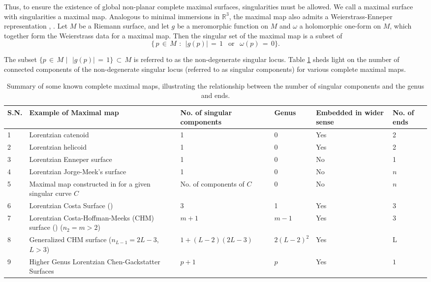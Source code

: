 \documentclass[12pt]{amsart}
\numberwithin{equation}{section}
\begin{document}
Thus, to ensure the existence of global non-planar complete maximal surfaces, singularities must be allowed. 
We call a maximal surface with singularities a maximal map. Analogous to minimal immersions in 
\(\mathbb{R}^3\), the maximal map also admits a Weierstrass-Enneper representation \cite{Estudillo1992}, 
\cite{KOBAYASHI1983}. Let \(M\) be a Riemann surface, and let \(g\) be a meromorphic function on
$M$ and \(\omega\) a 
holomorphic one-form on $M$, which together form the Weierstrass data for a maximal map. Then the
singular set of the maximal map is a subset of
 \[
 \{\,p \,\in\, M\ \, :\ \  |g(p)| \,=\, 1\, \;\text{ or }\, \; \omega(p) \,=\, 0\}.
\]

The subset \(\{p \,\in\, M\,\,\big\vert\,\,\,\, |g(p)| \,=\, 1\}\, \subset\, M\) is referred to as the
non-degenerate singular locus. Table \ref{Table of singular components} sheds light on the number of
connected components of the non-degenerate singular locus (referred to as singular components) for various
complete maximal maps.

\begin{table}[ht]
 \centering
\begin{tabular}{|m{1cm}|m{4cm}|m{3cm}|m{2cm}|m{2cm}|m{1cm}|}
\hline
       S.N. &Example of Maximal map & No. of singular components & Genus & Embedded in wider sense & No. of ends\\ \hline
       1 & Lorentzian catenoid & 1 & 0 & Yes & 2\\ \hline 
        2 &Lorentzian helicoid & 1 & 0 & Yes & 2 \\ \hline
         3& Lorentzian Enneper surface & 1 & 0 & No & 1 \\ \hline
        4& Lorentzian Jorge-Meek's surface & 1 & 0 & No & $n$\\ \hline
         5& Maximal map constructed in \cite{SaiPradip0genus} for a given singular curve $C$ & No. of components of $C$ & 0 & No & $n$\\ \hline
        6& Lorentzian Costa Surface (\cite{chen2024singularitiesmaxfacesconstructednodeopening}) & 3 & 1 & Yes & 3\\ \hline
         
        7& Lorentzian Costa-Hoffman-Meeks (CHM) surface (\cite{chen2024singularitiesmaxfacesconstructednodeopening}) ($n_2=m>2$) & $m+1$ & $m-1$ & Yes & 3\\ \hline
       8&  Generalized CHM surface ($n_{L-1}=2L-3$, $L>3$) & $1+ (L-2)(2L-3)$ & $2(L-2)^2$ & Yes & L\\ \hline
    9&Higher Genus Lorentzian Chen-Gackstatter Surfaces \cite{bardhan2023higher} & $p+1$ & $p$ & Yes & $1$\\ \hline
    \end{tabular}
    \caption{Summary of some known complete maximal maps, illustrating the relationship between
the number of singular components and the genus and ends.}
\label{Table of singular components}
\end{table}
\end{document}
